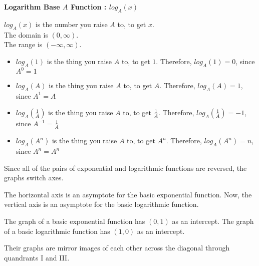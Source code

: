 \documentclass{ximera}
\begin{document}
\begin{definition} \textbf{\textcolor{green!50!black}{Logarithm Base $A$ Function : $log_A(x)$}}


$log_A(x)$ is the number you raise $A$ to, to get $x$. \\

The domain is $(0, \infty)$. \\

The range is $(-\infty, \infty)$.


\end{definition}




\begin{conclusion}

\begin{itemize}
\item $log_A(1)$ is the thing you raise $A$ to, to get $1$. Therefore, $log_A(1) = 0$, since $A^0 = 1$
\item $log_A(A)$ is the thing you raise $A$ to, to get $A$. Therefore, $log_A(A) = 1$, since $A^1 = A$
\item $log_A(\tfrac{1}{A})$ is the thing you raise $A$ to, to get $\tfrac{1}{A}$. Therefore, $log_A(\tfrac{1}{A}) = -1$, since $A^{-1} = \tfrac{1}{A}$
\item $log_A(A^n)$ is the thing you raise $A$ to, to get $A^n$. Therefore, $log_A(A^n) = n$, since $A^n = A^n$
\end{itemize}

\end{conclusion}



Since all of the pairs of exponential and logarithmic functions are reversed, the graphs switch axes.



The horizontal axis is an asymptote for the basic exponential function. Now, the vertical axis is an asymptote for the basic logarithmic function.


The graph of a basic exponential function has $(0,1)$ as an intercept.  The graph of a basic logarithmic function has $(1,0)$ as an intercept. 


Their graphs are mirror images of each other across the diagonal through quandrants I and III.
\end{document}
